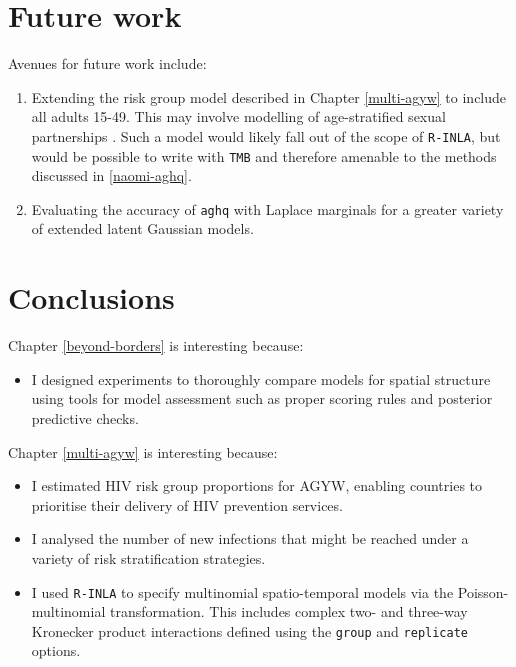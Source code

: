 \documentclass[a4paper, nobind]{templates/ociamthesis}
\providecommand{\tightlist}{%
  \setlength{\itemsep}{0pt}\setlength{\parskip}{0pt}}
\begin{document}
\adjustmtc
{}

\hypertarget{future-work}{%
\section{Future work}\label{future-work}}

Avenues for future work include:

\begin{enumerate}
\def\labelenumi{\arabic{enumi}.}
\tightlist
\item
  Extending the risk group model described in Chapter \ref{multi-agyw} to include all adults 15-49. This may involve modelling of age-stratified sexual partnerships \autocite{wolock2021evaluating}. Such a model would likely fall out of the scope of \texttt{R-INLA}, but would be possible to write with \texttt{TMB} and therefore amenable to the methods discussed in \ref{naomi-aghq}.
\item
  Evaluating the accuracy of \texttt{aghq} with Laplace marginals for a greater variety of extended latent Gaussian models.
\end{enumerate}

\hypertarget{conclusions-1}{%
\section{Conclusions}\label{conclusions-1}}

Chapter \ref{beyond-borders} is interesting because:

\begin{itemize}
\tightlist
\item
  I designed experiments to thoroughly compare models for spatial structure using tools for model assessment such as proper scoring rules and posterior predictive checks.
\end{itemize}

Chapter \ref{multi-agyw} is interesting because:

\begin{itemize}
\tightlist
\item
  I estimated HIV risk group proportions for AGYW, enabling countries to prioritise their delivery of HIV prevention services.
\item
  I analysed the number of new infections that might be reached under a variety of risk stratification strategies.
\item
  I used \texttt{R-INLA} to specify multinomial spatio-temporal models via the Poisson-multinomial transformation. This includes complex two- and three-way Kronecker product interactions defined using the \texttt{group} and \texttt{replicate} options.
\end{itemize}
\end{document}

